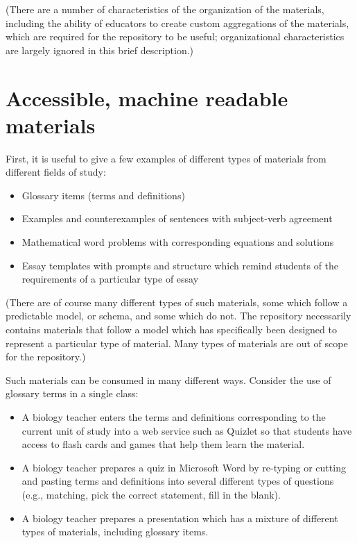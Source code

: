 (There are a number of characteristics of the organization of the materials,
including the ability of educators to create custom aggregations of the materials, which
are required for the repository to be useful; organizational characteristics
are largely ignored in this brief description.)

\section*{Accessible, machine readable materials}

First, it is useful to give a few examples of different types of materials
from different fields of study:

\begin{itemize}
\item Glossary items (terms and definitions)
\item Examples and counterexamples of sentences with subject-verb agreement
\item Mathematical word problems with corresponding equations and solutions
\item Essay templates with prompts and structure which remind students of the
requirements of a particular type of essay
\end{itemize}

(There are of course many different types of such materials, some which
follow a predictable model, or schema, and some which do not.  The repository
necessarily contains materials that follow a model which has specifically
been designed to represent a particular type of material.  Many types
of materials are out of scope for the repository.)

Such materials can be consumed in many different ways.  Consider the use of
glossary terms in a single class:

\begin{itemize}
\item A biology teacher enters the terms and definitions corresponding
to the current unit of study into a web service such as Quizlet so that
students have access to flash cards and games that help them learn the 
material.
\item A biology teacher prepares a quiz in Microsoft Word by re-typing
or cutting and pasting terms and definitions into several different types of
questions (e.g., matching, pick the correct statement, fill in the blank).
\item A biology teacher prepares a presentation which has a mixture of
different types of materials, including glossary items.
\end{itemize}

